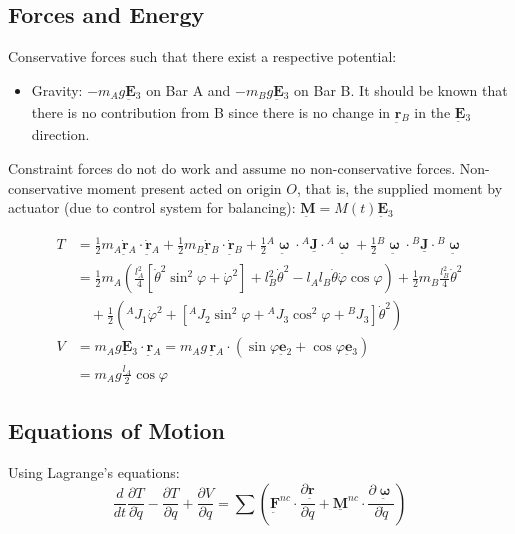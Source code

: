 \documentclass[12pt]{article}
\newcommand{\vb}[1]{{\underset{\tilde{}}{\mathbf{#1}}}}
\newcommand{\mb}[1]{\underline{\mathbf{#1}}}
\newcommand{\bomega}{\vb{\boldsymbol{\upomega}}}
\begin{document}
\subsection{Forces and Energy}
Conservative forces such that there exist a respective potential:
\begin{itemize}
    \item Gravity: $-m_A g \vb{E}{}_3$ on Bar A and $-m_B g \vb{E}{}_3$ on Bar B. It should be known that there is no contribution from B since there is no change in $\vb{r}{}_B$ in the $\vb{E}{}_3$ direction.
\end{itemize}

\noindent Constraint forces do not do work and assume no non-conservative forces. Non-conservative moment present acted on origin $O$, that is, the supplied moment by actuator (due to control system for balancing): \(\vb{M} = M(t)\vb{E}{}_3 \) 

\begin{align*}
    T &= \frac{1}{2}m{}_A \dot{\vb{r}}{}_A \cdot \dot{\vb{r}}{}_A + \frac{1}{2}m{}_B \dot{\vb{r}}{}_B \cdot \dot{\vb{r}}{}_B + \frac{1}{2} {}^A\bomega \cdot {}^A\mb{J} \cdot {}^A\bomega + \frac{1}{2} {}^B\bomega \cdot {}^B\mb{J} \cdot {}^B\bomega \\
      &= \frac{1}{2}m{}_A \left( \frac{l{}_A^2}{4} [\dot{\theta}^2\sin^2\varphi + \dot{\varphi}^2] + l{}_B^2\dot{\theta}^2 - l{}_A l{}_B \dot{\theta}\dot{\varphi}\cos\varphi \right) + \frac{1}{2}m{}_B \frac{l{}_B^2}{4} \dot{\theta}^2 \\
      &\quad + \frac{1}{2}\left( {}^A J{}_1 \dot{\varphi}^2 + \left[ {}^A J{}_2 \sin^2\varphi + {}^A J{}_3 \cos^2\varphi + {}^B J{}_3 \right] \dot{\theta}^2 \right) \\
    V &= m{}_A g \vb{E}{}_3 \cdot \vb{r}{}_A = m{}_A g \, \vb{r}{}_A \cdot (\sin\varphi \vb{e}{}_2 + \cos\varphi \vb{e}{}_3) \\
      &= m{}_A g \frac{l{}_A}{2} \cos\varphi
\end{align*}

\subsection{Equations of Motion}
Using Lagrange's equations:
$$ \frac{d}{dt} \frac{\partial T}{\partial \dot{q}} - \frac{\partial T}{\partial q} + \frac{\partial V}{\partial q} = \sum \left( \vb{F}^{nc} \cdot \frac{\partial \vb{r}}{\partial q} + \mb{M}^{nc} \cdot \frac{\partial \bomega}{\partial \dot{q}} \right) $$
\end{document}
